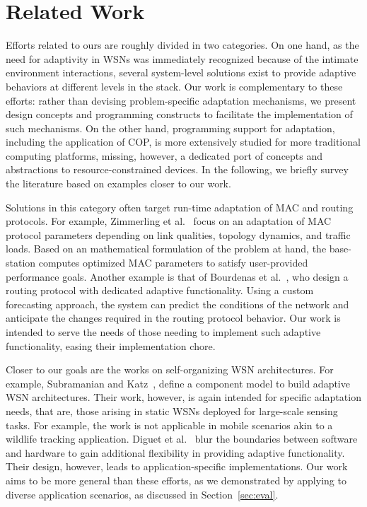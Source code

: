 \section{Related Work}\label{sec:related}

Efforts related to ours are roughly divided in two categories. On one
hand, as the need for adaptivity in WSNs was immediately recognized
because of the intimate environment interactions, several system-level
solutions exist to provide adaptive behaviors at different levels in
the stack. Our work is complementary to these efforts: rather than
devising problem-specific adaptation mechanisms, we present design
concepts and programming constructs to facilitate the implementation
of such mechanisms. On the other hand, programming support for
adaptation, including the application of COP, is more extensively
studied for more traditional computing platforms, missing, however, a
dedicated port of concepts and abstractions to resource-constrained
devices. In the following, we briefly survey the literature based on
examples closer to our work.

 Solutions in this category often
target run-time adaptation of MAC and routing protocols. For example,
Zimmerling et al.~\cite{zimmerling12} focus on an adaptation of MAC
protocol parameters depending on link qualities, topology dynamics,
and traffic loads. Based on an mathematical formulation of the problem
at hand, the base-station computes optimized MAC parameters to satisfy
user-provided performance goals. Another example is that of Bourdenas
et al.~\cite{Bourdenas11}, who design a routing protocol with
dedicated adaptive functionality. Using a custom forecasting approach,
the system can predict the conditions of the network and anticipate
the changes required in the routing protocol behavior. Our work is
intended to serve the needs of those needing to implement such
adaptive functionality, easing their implementation chore.

Closer to our goals are the works on self-organizing WSN
architectures. For example, Subramanian and Katz~\cite{Subramanian00},
define a component model to build adaptive WSN architectures. Their
work, however, is again intended for specific adaptation needs,
that are, those arising in static WSNs deployed for large-scale sensing
tasks. For example, the work is not applicable in mobile scenarios akin to a
wildlife tracking application. Diguet et
al.~\cite{Diguet11} blur the boundaries between software and hardware
to gain additional flexibility in providing adaptive
functionality. Their design, however, leads to application-specific
implementations. Our work aims to be more general than these efforts,
as we demonstrated by applying \conesc to diverse application
scenarios, as discussed in Section~\ref{sec:eval}.


